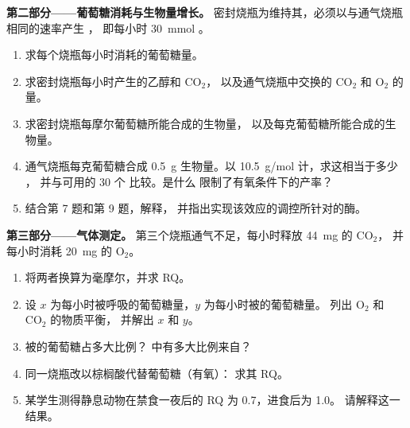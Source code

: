 \begin{problem}
\medskip
\noindent\textbf{第二部分——葡萄糖消耗与生物量增长。}
密封烧瓶为维持其，必须以与通气烧瓶相同的速率产生 ，
即每小时 \qty{30}{mmol} 。
\begin{enumerate}[resume]
  \item 求每个烧瓶每小时消耗的葡萄糖量。
  \item 求密封烧瓶每小时产生的乙醇和 $\mathrm{CO_2}$，
        以及通气烧瓶中交换的 $\mathrm{CO_2}$ 和
        $\mathrm{O_2}$ 的量。
  \item 求密封烧瓶每摩尔葡萄糖所能合成的生物量，
        以及每克葡萄糖所能合成的生物量。
  \item 通气烧瓶每克葡萄糖合成 \qty{0.5}{g} 生物量。以
        \qty{10.5}{g/mol} 计，求这相当于多少 ，
        并与可用的 30 个  比较。是什么
        限制了有氧条件下的产率？
  \item 结合第 7 题和第 9 题，解释，
        并指出实现该效应的调控所针对的酶。
\end{enumerate}

\medskip
\noindent\textbf{第三部分——气体测定。}
第三个烧瓶通气不足，每小时释放 \qty{44}{mg} 的 $\mathrm{CO_2}$，
并每小时消耗 \qty{20}{mg} 的 $\mathrm{O_2}$。
\begin{enumerate}[resume]
  \item 将两者换算为毫摩尔，并求 RQ。
  \item 设 $x$ 为每小时被呼吸的葡萄糖量，$y$ 为每小时被的葡萄糖量。
        列出 $\mathrm{O_2}$ 和 $\mathrm{CO_2}$ 的物质平衡，
        并解出 $x$ 和 $y$。
  \item 被的葡萄糖占多大比例？
         中有多大比例来自？
  \item 同一烧瓶改以棕榈酸代替葡萄糖（有氧）：
        求其 RQ。
  \item 某学生测得静息动物在禁食一夜后的 RQ 为 0.7，进食后为 1.0。
        请解释这一结果。
\end{enumerate}


\end{problem}
